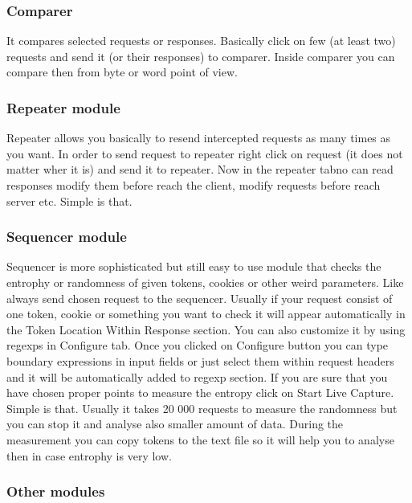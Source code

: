 \subsubsection{Comparer}
\label{subsubsec:comparer}
It compares selected requests or responses.
Basically click on few (at least two) requests and send it (or their responses) to comparer.
Inside comparer you can compare then from byte or word point of view.

\subsubsection{Repeater module}

Repeater allows you basically to resend intercepted requests as many times as you want.
In order to send request to repeater right click on request (it does not matter wher it is) and send it to repeater.
Now in the repeater tabno can read responses modify them before reach the client, modify requests before reach server etc.
Simple is that.


\subsubsection{Sequencer module}
Sequencer is more sophisticated but still easy to use module that checks the entrophy or randomness of given tokens, cookies or other weird parameters.
Like always send chosen request to the sequencer.
Usually if your request consist of one token, cookie or something you want to check it will appear automatically in the Token Location Within Response section.
You can also customize it by using regexps in Configure tab.
Once you clicked on Configure button you can type boundary expressions in input fields or just select them within request headers and it will be automatically added to regexp section.
If you are sure that you have chosen proper points to measure the entropy click on Start Live Capture.
Simple is that.
Usually it takes 20 000 requests to measure the randomness but you can stop it and analyse also smaller amount of data.
During the measurement you can copy tokens to the text file so it will help you to analyse then in case entrophy is very low.

\subsubsection{Other modules}

